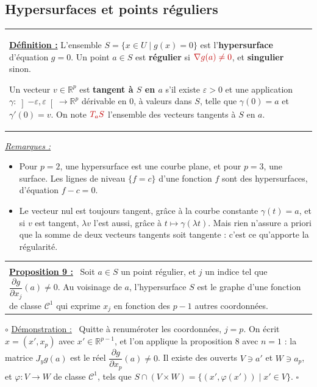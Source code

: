 \documentclass[a4paper,twoside]{report}
\makeatletter
\newcommand{\mot}[1]{\textcolor{rougecours}{\textbf{#1}}}
\newcommand{\rmath}[1]{\textcolor{rougecours}{#1}}
\newenvironment{cadre}%
 {\par\vspace{2mm}\noindent\begin{tabular}{|@{\hspace{4mm}}p{0.93\textwidth}@{\hspace{4mm}}|}
  \hline \\[-2mm]}%
 {\\[2mm] \hline \end{tabular}\par\vspace{3mm}}
\newcommand{\propo}[1]{\textbf{\underline{Proposition #1 :}}~}
\newenvironment{demo}%
 {\par\needspace{4\baselineskip}\vspace{1mm}\noindent$\circ$ \underline{Démonstration :}~\setlength{\parskip}{3pt plus 1pt}}%
 {\hfill$\square$\par\vspace{2mm}}
\newenvironment{remarques}%
 {\par\needspace{6\baselineskip}\vspace{1mm}\begin{list}{}{\leftmargin=1cm \rightmargin=0.5cm}\item[]%
  \textit{\underline{Remarques :}}%
  \begin{itemize}[label=$\bullet$,leftmargin=0.45cm,topsep=3pt,itemsep=4pt]}%
 {\end{itemize}\end{list}\vspace{1mm}}
\newcommand{\R}{\mathbb{R}}
\newcommand{\Cc}{\mathcal{C}}                     %
\newcommand{\dpd}[2]{\dfrac{\partial #1}{\partial #2}}  %
\newcommand{\grad}{\nabla}                        %
\newcommand{\Jac}{J}                              %
\makeatother
\begin{document}
\subsection{Hypersurfaces et points réguliers}

\begin{center}
\begin{tabularx}{15cm}{||X}
\noindent \textbf{\underline{Définition :}} L'ensemble $S = \{x \in U \mid g(x) = 0\}$ est l'\mot{hypersurface} d'équation $g = 0$. Un point $a \in S$ est \mot{régulier} si $\rmath{\grad g(a) \neq 0}$, et \mot{singulier} sinon.

\noindent Un vecteur $v \in \R^{p}$ est \mot{tangent à $S$ en $a$} s'il existe $\varepsilon > 0$ et une application $\gamma : \left]-\varepsilon, \varepsilon\right[ \to \R^{p}$ dérivable en $0$, à valeurs dans $S$, telle que $\gamma(0) = a$ et $\gamma'(0) = v$. On note $\rmath{T_{a}S}$ l'ensemble des vecteurs tangents à $S$ en $a$.
\end{tabularx}
\end{center}

\begin{remarques}
  \item Pour $p = 2$, une hypersurface est une courbe plane, et pour $p = 3$, une surface. Les lignes de niveau $\{f = c\}$ d'une fonction $f$ sont des hypersurfaces, d'équation $f - c = 0$.
  \item Le vecteur nul est toujours tangent, grâce à la courbe constante $\gamma(t) = a$, et si $v$ est tangent, $\lambda v$ l'est aussi, grâce à $t \mapsto \gamma(\lambda t)$. Mais rien n'assure a priori que la somme de deux vecteurs tangents soit tangente : c'est ce qu'apporte la régularité.
\end{remarques}

\begin{cadre}
\propo{9} Soit $a \in S$ un point régulier, et $j$ un indice tel que $\dpd{g}{x_{j}}(a) \neq 0$. Au voisinage de $a$, l'hypersurface $S$ est le graphe d'une fonction de classe $\Cc^{1}$ qui exprime $x_{j}$ en fonction des $p - 1$ autres coordonnées.
\end{cadre}

\begin{demo}
Quitte à renuméroter les coordonnées, $j = p$. On écrit $x = (x', x_{p})$ avec $x' \in \R^{p - 1}$, et l'on applique la proposition 8 avec $n = 1$ : la matrice $\Jac_{y} g(a)$ est le réel $\dpd{g}{x_{p}}(a) \neq 0$. Il existe des ouverts $V \ni a'$ et $W \ni a_{p}$, et $\varphi : V \to W$ de classe $\Cc^{1}$, tels que $S \cap (V \times W) = \{(x', \varphi(x')) \mid x' \in V\}$.
\end{demo}
\end{document}
